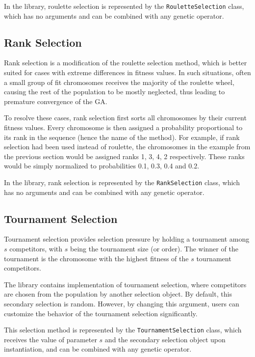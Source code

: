 In the library, roulette selection is represented by the \texttt{RouletteSelection} class, which has no arguments and can be combined with any genetic operator.

\subsection{Rank Selection}
Rank selection is a modification of the roulette selection method, which is better suited for cases with extreme differences in fitness values. In such situations, often a small group of fit chromosomes receives the majority of the roulette wheel, causing the rest of the population to be mostly neglected, thus leading to premature convergence of the GA.

To resolve these cases, rank selection first sorts all chromosomes by their current fitness values. Every chromosome is then assigned a probability proportional to its rank in the sequence (hence the name of the method). For example, if rank selection had been used instead of roulette, the chromosomes in the example from the previous section would be assigned ranks 1, 3, 4, 2 respectively. These ranks would be simply normalized to probabilities 0.1, 0.3, 0.4 and 0.2.

In the library, rank selection is represented by the \texttt{RankSelection} class, which has no arguments and can be combined with any genetic operator.

\subsection{Tournament Selection}
Tournament selection provides selection pressure by holding a tournament among $s$ competitors, with $s$ being the tournament size (or order). The winner of the tournament is the chromosome with the highest fitness of the $s$ tournament competitors. \cite{GaTournamentSelection}

The library contains implementation of tournament selection, where competitors are chosen from the population by another selection object. By default, this secondary selection is random. However, by changing this argument, users can customize the behavior of the tournament selection significantly.

This selection method is represented by the \texttt{TournamentSelection} class, which receives the value of parameter $s$ and the secondary selection object upon instantiation, and can be combined with any genetic operator.

